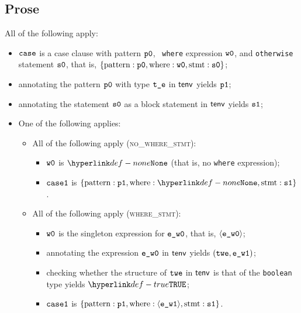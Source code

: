 \documentclass{book}
\newcommand\ProseOrTypeError[0]{\ProseTerminateAs{\TypeErrorConfig}}
\begin{document}
\subsection{Prose}
All of the following apply:
\begin{itemize}
  \item $\texttt{case}$ is a case clause with pattern $\texttt{p0}$, \optional\ \texttt{where} expression $\texttt{w0}$,
        and \texttt{otherwise} statement $\texttt{s0}$, that is,
        $\{ \text{pattern}: \texttt{p0}, \text{where}: \texttt{w0}, \text{stmt}: \texttt{s0} \}$;
  \item annotating the pattern $\texttt{p0}$ with type $\texttt{t\_e}$ in $\textsf{tenv}$ yields $\texttt{p1}$\ProseOrTypeError;
  \item annotating the statement $\texttt{s0}$ as a block statement in $\textsf{tenv}$ yields $\texttt{s1}$\ProseOrTypeError;
  \item One of the following applies:
  \begin{itemize}
    \item All of the following apply (\textsc{no\_where\_stmt}):
    \begin{itemize}
      \item $\texttt{w0}$ is $\None$ (that is, no \texttt{where} expression);
      \item $\texttt{case1}$ is $\{ \CasePattern: \vpone, \CaseWhere: \None, \CaseStmt: \vsone \}$.
    \end{itemize}

    \item All of the following apply (\textsc{where\_stmt}):
    \begin{itemize}
      \item $\texttt{w0}$ is the singleton expression for $\texttt{e\_w0}$, that is, $\langle\texttt{e\_w0}\rangle$;
      \item annotating the expression $\texttt{e\_w0}$ in $\textsf{tenv}$ yields $(\texttt{twe}, \texttt{e\_w1})$\ProseOrTypeError;
      \item checking whether the structure of $\texttt{twe}$ in $\textsf{tenv}$ is that of the \texttt{boolean} type yields $\True$\ProseOrTypeError;
      \item $\texttt{case1}$ is $\{ \text{pattern}: \texttt{p1}, \text{where}: \langle\texttt{e\_w1}\rangle, \text{stmt}: \texttt{s1} \}$.
    \end{itemize}
  \end{itemize}
\end{itemize}
\end{document}
